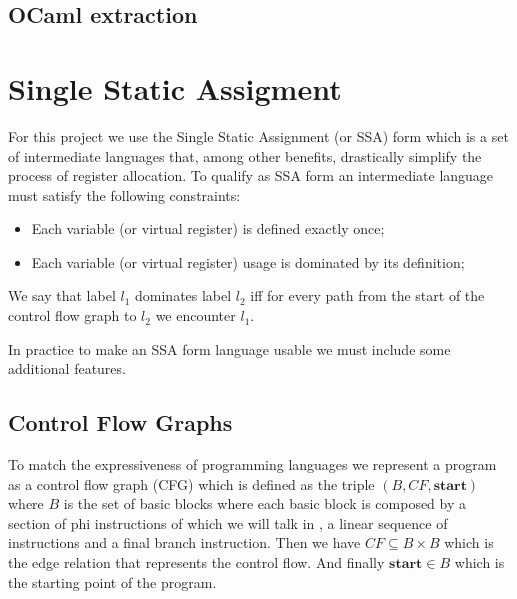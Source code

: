 \subsection{OCaml extraction}

\section{Single Static Assigment}
\label{sec:ssa}
For this project we use the Single Static Assignment (or SSA) form which is a set of intermediate languages that, among other benefits, drastically simplify the process of register allocation.
To qualify as SSA form an intermediate language must satisfy the following constraints:
\begin{itemize}
    \item Each variable (or virtual register) is defined exactly once;
    \item Each variable (or virtual register) usage is dominated by its definition;
\end{itemize}
We say that label $l_1$ dominates label $l_2$ iff for every path from the start of the control flow graph to $l_2$ we encounter $l_1$.

In practice to make an SSA form language usable we must include some additional features.

\subsection{Control Flow Graphs}
\label{subsec:cfg}
To match the expressiveness of programming languages we represent a program as a control flow graph (CFG) which is defined as the triple $(B, CF, \textbf{start})$ where $B$ is the set of basic blocks where each basic block is composed by a section of phi instructions of which we will talk in , a linear sequence of instructions and a final branch instruction. Then we have $CF \subseteq B \times B$ which is the edge relation that represents the control flow. And finally $\textbf{start} \in B$ which is the starting point of the program.

